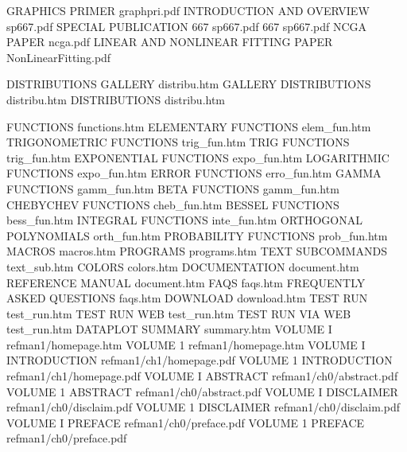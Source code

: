 GRAPHICS PRIMER                         graphpri.pdf
INTRODUCTION AND OVERVIEW               sp667.pdf
SPECIAL PUBLICATION 667                 sp667.pdf
667                                     sp667.pdf
NCGA PAPER                              ncga.pdf
LINEAR AND NONLINEAR FITTING PAPER      NonLinearFitting.pdf

DISTRIBUTIONS GALLERY                   distribu.htm
GALLERY DISTRIBUTIONS                   distribu.htm
DISTRIBUTIONS                           distribu.htm

FUNCTIONS                               functions.htm
ELEMENTARY FUNCTIONS                    elem_fun.htm
TRIGONOMETRIC FUNCTIONS                 trig_fun.htm
TRIG FUNCTIONS                          trig_fun.htm
EXPONENTIAL FUNCTIONS                   expo_fun.htm
LOGARITHMIC FUNCTIONS                   expo_fun.htm
ERROR FUNCTIONS                         erro_fun.htm
GAMMA FUNCTIONS                         gamm_fun.htm
BETA FUNCTIONS                          gamm_fun.htm
CHEBYCHEV FUNCTIONS                     cheb_fun.htm
BESSEL FUNCTIONS                        bess_fun.htm
INTEGRAL FUNCTIONS                      inte_fun.htm
ORTHOGONAL POLYNOMIALS                  orth_fun.htm
PROBABILITY FUNCTIONS                   prob_fun.htm
MACROS                                  macros.htm
PROGRAMS                                programs.htm
TEXT SUBCOMMANDS                        text_sub.htm
COLORS                                  colors.htm
DOCUMENTATION                           document.htm
REFERENCE MANUAL                        document.htm
FAQS                                    faqs.htm
FREQUENTLY ASKED QUESTIONS              faqs.htm
DOWNLOAD                                download.htm
TEST RUN                                test_run.htm
TEST RUN WEB                            test_run.htm
TEST RUN VIA WEB                        test_run.htm
DATAPLOT SUMMARY                        summary.htm
VOLUME I                                refman1/homepage.htm
VOLUME 1                                refman1/homepage.htm
VOLUME I INTRODUCTION                   refman1/ch1/homepage.pdf
VOLUME 1 INTRODUCTION                   refman1/ch1/homepage.pdf
VOLUME I ABSTRACT                       refman1/ch0/abstract.pdf
VOLUME 1 ABSTRACT                       refman1/ch0/abstract.pdf
VOLUME I DISCLAIMER                     refman1/ch0/disclaim.pdf
VOLUME 1 DISCLAIMER                     refman1/ch0/disclaim.pdf
VOLUME I PREFACE                        refman1/ch0/preface.pdf
VOLUME 1 PREFACE                        refman1/ch0/preface.pdf
